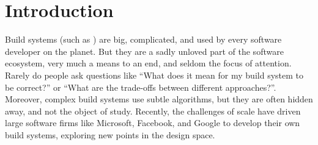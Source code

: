 \section{Introduction}\label{sec-intro}

Build systems (such as \Make) are big, complicated, and used by every
software developer on the planet.  But they are a sadly unloved part
of the software ecosystem, very much a means to an end, and seldom the
focus of attention.
Rarely do people ask questions like ``What does it mean for my build
system to be correct?'' or ``What are the trade-offs between different
approaches?''.  Moreover, complex build systems use subtle algorithms, but they
are often hidden away, and not the object of study.
Recently, the challenges of scale have driven large software firms
like Microsoft, Facebook, and Google to develop their own build
systems, exploring new points in the design space.

